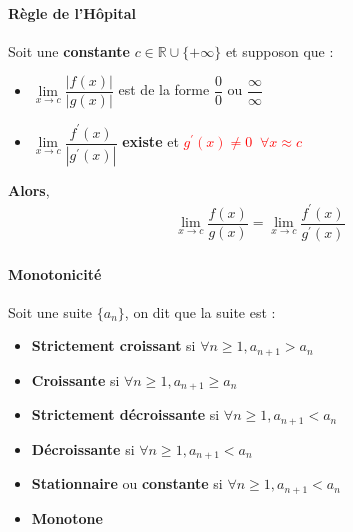 \documentclass[2pt]{report}
\begin{document}
\begin{multicols*}{3}
    \paragraph{Règle de l'Hôpital}
        Soit une \textbf{constante} $c \in \mathbb{R} \cup \{+\infty\}$ et supposon que : 
        \begin{itemize}
        \item $\lim\limits_{x\to c}\dfrac{|f(x)|}{|g(x)|}$ 
            est de la forme $\dfrac{0}{0}$ ou 
            $\dfrac{\infty }{\infty }$
        \item $\lim\limits_{x\to c}\dfrac{f^{\prime}(x)}{|g^{\prime}(x)|}$
            \textbf{existe} et 
            \textcolor{red}{$g^{\prime}(x) \neq 0 \;\; \forall x \approx c$ }
        \end{itemize}
        \textbf{Alors}, 
        \begin{align*}
            \lim\limits_{x\to c}\dfrac{f(x)}{g(x)} = 
            \lim\limits_{x\to c}\dfrac{f^{\prime}(x)}{g^{\prime}(x)}
        \end{align*}
        


    \paragraph{Monotonicité} 
        Soit une suite $\{a_n \}$, on dit que la suite est :
        \begin{itemize}
            \item \textbf{Strictement croissant} si $\forall n \geq 1, 
                a_{n+1} > a_n$
            \item \textbf{Croissante} si $\forall n \geq 1, 
                a_{n+1} \geq a_n$ 
            \item \textbf{Strictement décroissante} si $\forall n \geq 1, 
                a_{n+1} < a_n$ 
            \item \textbf{Décroissante} si $\forall n \geq 1, 
                a_{n+1} < a_n$ 
            \item \textbf{Stationnaire} ou \textbf{constante} si 
                $\forall n \geq 1, 
                a_{n+1} < a_n$ 
            \item \textbf{Monotone}  
        \end{itemize} 




\end{multicols*}
\end{document}
